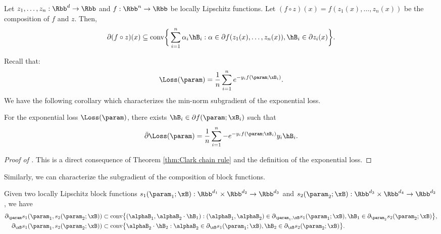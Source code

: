 \begin{theorem}
\label{thm:Clark chain rule}
Let $z_1,\ldots ,z_n: \Rbb^d \to \Rbb$ and $f: \Rbb^n \to \Rbb$ be locally Lipschitz functions. Let $(f \circ z) (x) = f(z_1(x),\ldots ,z_n(x))$ be the composition of $f$ and $z$. Then, 
\[
\partial (f \circ z) (x) 
\subseteq 
\text{conv} \bigg\{\sum_{i=1}^n \alpha _i \hB_i : \alpha \in \partial f(z_1(x),\ldots, z_n(x)), \hB_i \in \partial z_i(x) \bigg\}.
\]
\end{theorem}


Recall that: 
\[
    \Loss(\param) = \frac{1}{n} \sum_{i=1}^n e^{- y_i f(\param; \xB_i)}. 
\]
We have the following corollary which characterizes the min-norm subgradient of the exponential loss.

\begin{corollary}
\label{cor:subgrad-exp-loss}
For the exponential loss $\Loss(\param)$, there exists $\hB_i \in \partial f(\param; \xB_i)$ such that
\[
\bar \partial \Loss(\param) = \frac{1}{n} \sum_{i=1}^n -  e^{- y_i f(\param; \xB_i)} y_i\hB_i.
\]
\end{corollary}
\begin{proof}[Proof of ]
    This is a direct consequence of Theorem \ref{thm:Clark chain rule} and the definition of the exponential loss.
\end{proof}

Similarly, we can characterize the subgradient of the composition of block functions. 
\begin{corollary}
\label{cor:subgrad-comp-block}
Given two locally Lipschitz block functions 
$s_1(\param_1; \xB): \Rbb^{d_1} \times \Rbb^{d_2} \to \Rbb^{d_3}$ and $s_2(\param_2; \xB): \Rbb^{d_3} \times \Rbb^{d_4} \to \Rbb^{d_2}$, 
we have 
\begin{align*}
\partial_{\param} s_1(\param_1, s_2(\param_2;\xB)) 
&\subset \text{conv} \big\{ (\alphaB_1, \alphaB_2 \cdot\hB_1) : (\alphaB_1, \alphaB_2) \in \partial_{\param_1, \xB} s_1 (\param_1;\xB), \hB_1 \in \partial_{\param_2} s_2(\param_2;\xB)  \big\},\\   
\partial_{\xB} s_1(\param_1, s_2(\param_2;\xB)) 
&\subset \text{conv} \big\{ \alphaB_2 \cdot\hB_2 :  \alphaB_2 \in \partial_{\xB} s_1 (\param_1;\xB), \hB_2 \in \partial_{\xB} s_2(\param_2;\xB)  \big\}.  
\end{align*}
\end{corollary}

